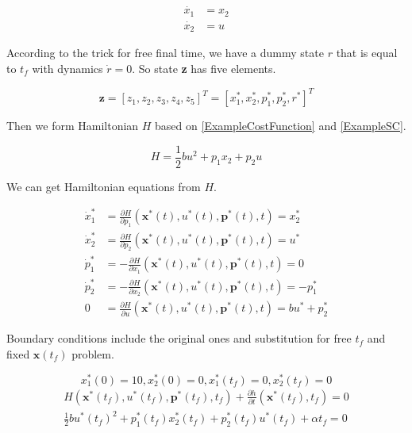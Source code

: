\documentclass[twoside]{article}
\begin{document}
\begin{equation}\label{ExampleSC}%
\begin{split}
\dot{x_1} &= x_2 \\
\dot{x_2} &= u
\end{split}
\end{equation}

According to the trick for free final time, we have a dummy state $r$ that is equal to $t_f$ with dynamics $\dot{r} = 0$. So state \textbf{z} has five elements.

\begin{equation}\label{ExampleState}
\textbf{z} = [z_1, z_2, z_3, z_4, z_5] ^T= [x_1^*, x_2^*, p_1^*, p_2^*, r^*]^T
\end{equation}

Then we form Hamiltonian $H$ based on \eqref{ExampleCostFunction} and \eqref{ExampleSC}.

\begin{equation}\label{ExampleH}
H = \frac{1}{2}bu^2 + p_1x_2 + p_2u
\end{equation}

We can get Hamiltonian equations from $H$.

\begin{equation}\label{ExampleHEqs}
\begin{split}
\dot{x}_1^* &= \frac{\partial{H}}{\partial{p_1}}(\textbf{x}^*(t),u^*(t),\textbf{p}^*(t),t)= x_2^* \\
\dot{x}_2^* &= \frac{\partial{H}}{\partial{p_2}}(\textbf{x}^*(t),u^*(t),\textbf{p}^*(t),t)= u^* \\
\dot{p}_1^* &= -\frac{\partial{H}}{\partial{x_1}}(\textbf{x}^*(t),u^*(t),\textbf{p}^*(t),t)= 0 \\
\dot{p}_2^* &= -\frac{\partial{H}}{\partial{x_2}}(\textbf{x}^*(t),u^*(t),\textbf{p}^*(t),t)=-p_1^* \\
0 &= \frac{\partial{H}}{\partial{u}}(\textbf{x}^*(t),u^*(t),\textbf{p}^*(t),t) = bu^* + p_2^*
\end{split}
\end{equation}

Boundary conditions include the original ones and substitution for free $t_f$ and fixed $\textbf{x}(t_f)$ problem.

\begin{equation}\label{ExampleBC1*}
x_1^*(0) = 10, x_2^*(0) = 0, x_1^*(t_f) = 0, x_2^*(t_f) = 0
\end{equation}
\begin{equation}\label{ExampleBC2*}
\begin{split}
H(\textbf{x}^*(t_f), u^*(t_f), \textbf{p}^*(t_f), t_f)+\frac{\partial{h}}{\partial{t}}(\textbf{x}^*(t_f),t_f) = 0 \\
\frac{1}{2}bu^*(t_f)^2 + p_1^*(t_f)x_2^*(t_f)+p_2^*(t_f)u^*(t_f) + \alpha t_f = 0
\end{split}
\end{equation}
\end{document}
